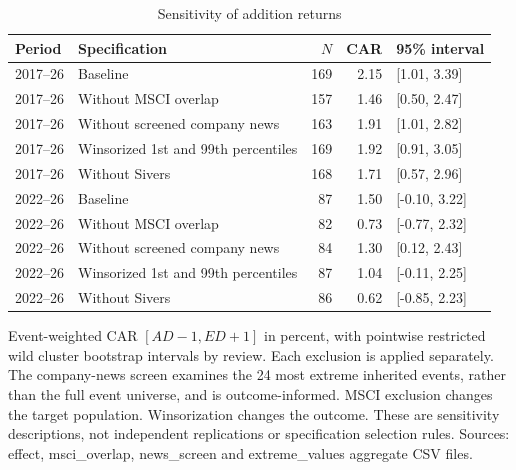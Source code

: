 \begin{table}[!htbp]
\centering
\caption{Sensitivity of addition returns}\label{tab:robustness}
\small
\setlength{\tabcolsep}{5pt}
\begin{tabular}{llrrl}
\toprule
Period & Specification & $N$ & CAR & 95\% interval \\
\midrule
2017--26 & Baseline & 169 & 2.15 & [1.01, 3.39] \\
2017--26 & Without MSCI overlap & 157 & 1.46 & [0.50, 2.47] \\
2017--26 & Without screened company news & 163 & 1.91 & [1.01, 2.82] \\
2017--26 & Winsorized 1st and 99th percentiles & 169 & 1.92 & [0.91, 3.05] \\
2017--26 & Without Sivers & 168 & 1.71 & [0.57, 2.96] \\
2022--26 & Baseline & 87 & 1.50 & [-0.10, 3.22] \\
2022--26 & Without MSCI overlap & 82 & 0.73 & [-0.77, 2.32] \\
2022--26 & Without screened company news & 84 & 1.30 & [0.12, 2.43] \\
2022--26 & Winsorized 1st and 99th percentiles & 87 & 1.04 & [-0.11, 2.25] \\
2022--26 & Without Sivers & 86 & 0.62 & [-0.85, 2.23] \\
\bottomrule
\end{tabular}
\begin{minipage}{\linewidth}\footnotesize\vspace{5pt}
Event-weighted CAR $[AD-1,ED+1]$ in percent, with pointwise restricted wild cluster bootstrap intervals by review. Each exclusion is applied separately. The company-news screen examines the 24 most extreme inherited events, rather than the full event universe, and is outcome-informed. MSCI exclusion changes the target population. Winsorization changes the outcome. These are sensitivity descriptions, not independent replications or specification selection rules. Sources: effect, msci\_overlap, news\_screen and extreme\_values aggregate CSV files.
\end{minipage}
\end{table}
